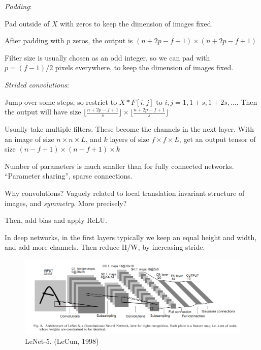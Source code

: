 \documentclass[english]{article}
\begin{document}
\item \emph{Padding}: 

Pad outside of $X$ with zeros to keep the dimension of images fixed. 

After padding with $p$ zeros, the output is $(n+2p-f+1) \times (n+2p-f+1)$

Filter size is usually chosen as an odd integer, so we can pad with $p = (f-1)/2$ pixels everywhere, to keep the dimension of images fixed. 

\item \emph{Strided convolutions}:

Jump over some steps, so restrict to $X * F[i,j]$ to $i,j=1,1+s,1+2s,\ldots$.
Then the output will have size $\lfloor \frac{n+2p-f+1}{s}\rfloor \times \lfloor \frac{n+2p-f+1}{s}\rfloor$

\item Usually take multiple filters. These become the channels in the next layer. With an image of size $n \times n \times L$, and $k$ layers of size 
$f \times f \times L$, get  an output tensor of size $(n-f+1) \times (n-f+1) \times k$ 


Number of parameters is much smaller than for fully connected networks. ``Parameter sharing'', sparse connections. %

Why convolutions? Vaguely related to local translation invariant structure of images, and \emph{symmetry}. %
More precisely?


\item Then, add bias and apply ReLU. 
 
In deep networks, in the first layers typically we keep an equal height and width, and add more channels. Then reduce H/W, by increasing stride. %

\begin{figure}
  \centering
  \includegraphics[scale=0.3]{lenet.png}
  \caption{LeNet-5. (LeCun, 1998)}
  \label{lenet5}
\end{figure}
\end{document}
